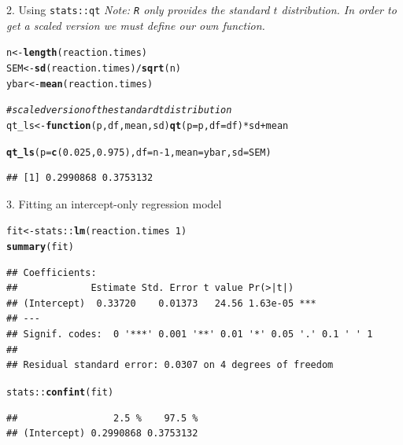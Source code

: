 \documentclass[10pt,handout]{beamer}\usepackage[]{graphicx}\usepackage[]{color}
\makeatletter
\newcommand{\hlnum}[1]{\textcolor[rgb]{0.686,0.059,0.569}{#1}}%
\newcommand{\hlcom}[1]{\textcolor[rgb]{0.678,0.584,0.686}{\textit{#1}}}%
\newcommand{\hlopt}[1]{\textcolor[rgb]{0,0,0}{#1}}%
\newcommand{\hlstd}[1]{\textcolor[rgb]{0.345,0.345,0.345}{#1}}%
\newcommand{\hlkwa}[1]{\textcolor[rgb]{0.161,0.373,0.58}{\textbf{#1}}}%
\newcommand{\hlkwb}[1]{\textcolor[rgb]{0.69,0.353,0.396}{#1}}%
\newcommand{\hlkwc}[1]{\textcolor[rgb]{0.333,0.667,0.333}{#1}}%
\newcommand{\hlkwd}[1]{\textcolor[rgb]{0.737,0.353,0.396}{\textbf{#1}}}%
\newenvironment{kframe}{%
 \def\at@end@of@kframe{}%
 \ifinner\ifhmode%
  \def\at@end@of@kframe{\end{minipage}}%
  \begin{minipage}{\columnwidth}%
 \fi\fi%
 \def\FrameCommand##1{\hskip\@totalleftmargin \hskip-\fboxsep
 \colorbox{shadecolor}{##1}\hskip-\fboxsep
     \hskip-\linewidth \hskip-\@totalleftmargin \hskip\columnwidth}%
 \MakeFramed {\advance\hsize-\width
   \@totalleftmargin\z@ \linewidth\hsize
   \@setminipage}}%
 {\par\unskip\endMakeFramed%
 \at@end@of@kframe}
\newenvironment{knitrout}{}{} %
\makeatother
\begin{document}
\begin{frame}[fragile]{2. Using \texttt{stats::qt}}
	\textit{Note: \texttt{R} only provides the standard $t$ distribution. In order to get a scaled version we must define our own function.}
	
	\vspace*{0.2in}
	
\begin{knitrout}\tiny
{}\color{fgcolor}\begin{kframe}
\begin{alltt}
\hlstd{n} \hlkwb{<-} \hlkwd{length}\hlstd{(reaction.times)}
\hlstd{SEM} \hlkwb{<-} \hlkwd{sd}\hlstd{(reaction.times)}\hlopt{/}\hlkwd{sqrt}\hlstd{(n)}
\hlstd{ybar} \hlkwb{<-} \hlkwd{mean}\hlstd{(reaction.times)}

\hlcom{# scaled version of the standard t distribution}
\hlstd{qt_ls} \hlkwb{<-} \hlkwa{function}\hlstd{(}\hlkwc{p}\hlstd{,} \hlkwc{df}\hlstd{,} \hlkwc{mean}\hlstd{,} \hlkwc{sd}\hlstd{)} \hlkwd{qt}\hlstd{(}\hlkwc{p} \hlstd{= p,} \hlkwc{df} \hlstd{= df)} \hlopt{*} \hlstd{sd} \hlopt{+} \hlstd{mean}

\hlkwd{qt_ls}\hlstd{(}\hlkwc{p} \hlstd{=} \hlkwd{c}\hlstd{(}\hlnum{0.025}\hlstd{,} \hlnum{0.975}\hlstd{),} \hlkwc{df} \hlstd{= n} \hlopt{-} \hlnum{1}\hlstd{,} \hlkwc{mean} \hlstd{= ybar,} \hlkwc{sd} \hlstd{= SEM)}
\end{alltt}
\begin{verbatim}
## [1] 0.2990868 0.3753132
\end{verbatim}
\end{kframe}
\end{knitrout}
\end{frame}


\begin{frame}[fragile]{3. Fitting an intercept-only regression model}
\begin{knitrout}\tiny
{}\color{fgcolor}\begin{kframe}
\begin{alltt}
\hlstd{fit} \hlkwb{<-} \hlstd{stats}\hlopt{::}\hlkwd{lm}\hlstd{(reaction.times} \hlopt{~} \hlnum{1}\hlstd{)}
\hlkwd{summary}\hlstd{(fit)}
\end{alltt}
\begin{verbatim}
## Coefficients:
##             Estimate Std. Error t value Pr(>|t|)    
## (Intercept)  0.33720    0.01373   24.56 1.63e-05 ***
## ---
## Signif. codes:  0 '***' 0.001 '**' 0.01 '*' 0.05 '.' 0.1 ' ' 1
## 
## Residual standard error: 0.0307 on 4 degrees of freedom
\end{verbatim}
\begin{alltt}
\hlstd{stats}\hlopt{::}\hlkwd{confint}\hlstd{(fit)}
\end{alltt}
\begin{verbatim}
##                 2.5 %    97.5 %
## (Intercept) 0.2990868 0.3753132
\end{verbatim}
\end{kframe}
\end{knitrout}
\end{frame}
\end{document}
